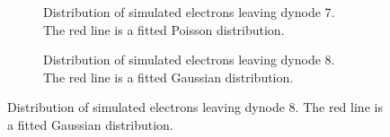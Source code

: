 \begin{figure}
\vspace{3mm}

\begin{subfigure}[b]{0.44\textwidth}
\caption{Distribution of simulated electrons leaving dynode 7. The red line is a fitted Poisson distribution.}
\end{subfigure}
\hspace{3mm}
\begin{subfigure}[b]{0.44\textwidth}
\caption{Distribution of simulated electrons leaving dynode 8. The red line is a fitted Gaussian distribution.}
\end{subfigure}
\end{figure}

